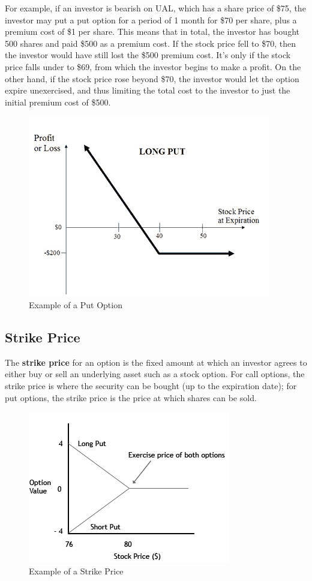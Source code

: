 \documentclass[11pt]{article}
\begin{document}
For example, if an investor is bearish on UAL, which has a share price of \$75, the investor may put a put option for a period of 1 month for \$70 per share, plus a premium cost of \$1 per share. This means that in total, the investor has bought 500 shares and paid \$500 as a premium cost. If the stock price fell to \$70, then the investor would have still lost the \$500 premium cost. It's only if the stock price falls under to \$69, from which the investor begins to make a profit. On the other hand, if the stock price rose beyond \$70, the investor would let the option expire unexercised, and thus limiting the total cost to the investor to just the initial premium cost of \$500.

\begin{figure}[h]
\centering
\includegraphics[scale=0.5]{long-put}
\caption{Example of a Put Option}
\end{figure}
    
\subsection{Strike Price}
The {\bf strike price} for an option is the fixed
amount at which an investor agrees to either buy
or sell an underlying asset such as a stock option.
For call options, the strike price is where the
security can be bought (up to the expiration date);
for put options, the strike price is the price at
which shares can be sold.~\cite{strike_price}

\begin{figure}[h]
\centering
\includegraphics[scale=0.7]{strike-price}
\caption{Example of a Strike Price}
\end{figure}
\end{document}
